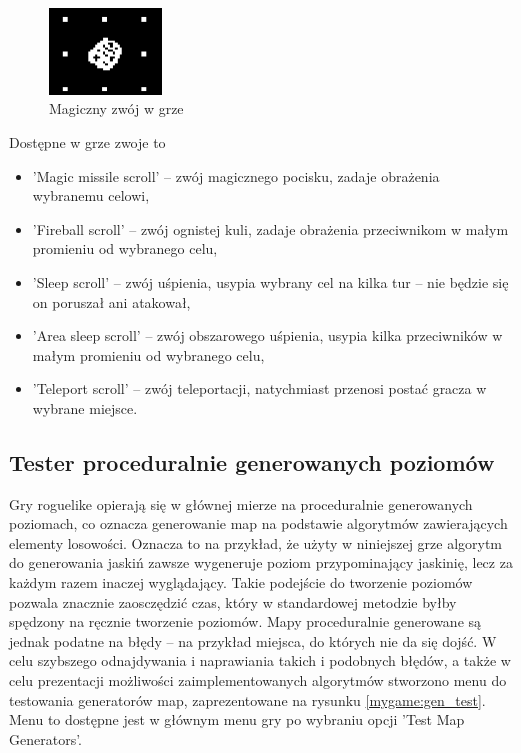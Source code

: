 \documentclass[12pt,twoside]{article}
\begin{document}
\FloatBarrier
\begin{figure}[h]
	\centering
	\includegraphics[width=3cm]{images/mygame/scroll.png}
	\caption{Magiczny zwój w grze}
	\label{mygame:scroll}
\end{figure}
\FloatBarrier

Dostępne w grze zwoje to 
\begin{itemize}
	\item 'Magic missile scroll' -- zwój magicznego pocisku, zadaje obrażenia wybranemu celowi,
	\item 'Fireball scroll' -- zwój ognistej kuli, zadaje obrażenia przeciwnikom w małym promieniu od wybranego celu,			
	\item 'Sleep scroll' -- zwój uśpienia, usypia wybrany cel na kilka tur -- nie będzie się on poruszał ani atakował,
	\item 'Area sleep scroll' -- zwój obszarowego uśpienia, usypia kilka przeciwników w małym promieniu od wybranego celu,
	\item 'Teleport scroll' -- zwój teleportacji, natychmiast przenosi postać gracza w wybrane miejsce.	
\end{itemize}


\subsection{Tester proceduralnie generowanych poziomów}
Gry roguelike opierają się w głównej mierze na proceduralnie generowanych poziomach, co oznacza generowanie map na podstawie algorytmów zawierających elementy losowości. Oznacza to na przykład, że użyty w niniejszej grze algorytm do generowania jaskiń zawsze wygeneruje poziom przypominający jaskinię, lecz za każdym razem inaczej wyglądający. Takie podejście do tworzenie poziomów pozwala znacznie zaosczędzić czas, który w standardowej metodzie byłby spędzony na ręcznie tworzenie poziomów. Mapy proceduralnie generowane są jednak podatne na błędy -- na przykład miejsca, do których nie da się dojść. W celu szybszego odnajdywania i naprawiania takich i podobnych błędów, a także w celu prezentacji możliwości zaimplementowanych algorytmów stworzono menu do testowania generatorów map, zaprezentowane na rysunku \ref{mygame:gen_test}. Menu to dostępne jest w głównym menu gry po wybraniu opcji 'Test Map Generators'.
\end{document}
